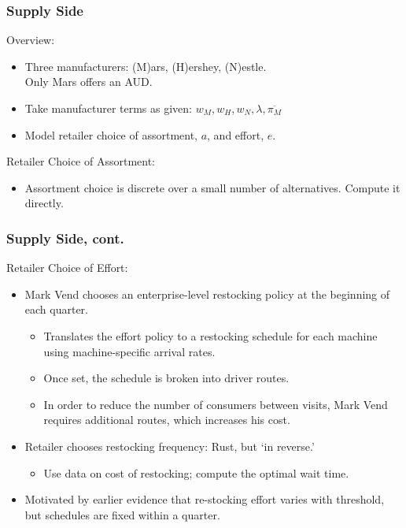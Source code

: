 \begin{frame}
\frametitle{Supply Side}
Overview:
\begin{itemize}
\item Three manufacturers:  (M)ars, (H)ershey, (N)estle. \\ Only Mars offers an AUD.
\item Take manufacturer terms as given: $w_M, w_H, w_N, \lambda, \overline{\pi_M}$
\item Model retailer choice of assortment, $a$, and effort, $e$.%
\end{itemize}
Retailer Choice of Assortment:
\begin{itemize}
\item Assortment choice is discrete over a small number of alternatives. Compute it directly.
\end{itemize}
\end{frame}

\begin{frame}
\frametitle{Supply Side, cont.}

Retailer Choice of Effort:
\begin{itemize}
\item Mark Vend chooses an enterprise-level restocking policy at the beginning of each quarter.
	\begin{itemize}
	\item Translates the effort policy to a restocking schedule for each machine using machine-specific arrival rates.
	\item Once set, the schedule is broken into driver routes.
	\item In order to reduce the number of consumers between visits, Mark Vend requires additional routes, which increases his cost.
	\end{itemize}
\item Retailer chooses restocking frequency: Rust, but `in reverse.'
\begin{itemize}
\item Use data on cost of restocking; compute the optimal wait time.
\end{itemize}
\item Motivated by earlier evidence that re-stocking effort varies with threshold, but schedules are fixed within a quarter.
\end{itemize}
\end{frame}

